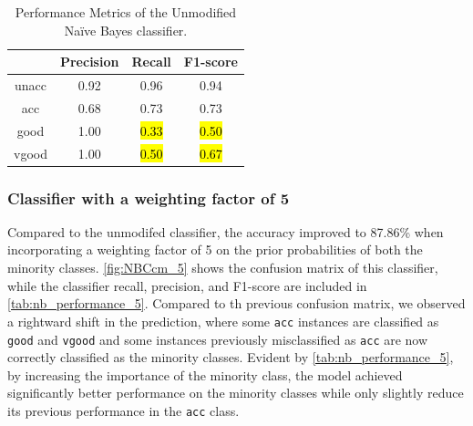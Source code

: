 \documentclass[a4paper]{article}
\begin{document}
\begin{table}[h!]
  \centering
  \caption{Performance Metrics of the Unmodified Naïve Bayes classifier.}
  \label{tab:nb_performance_unmodified}
  \begin{tabular}{||cccc||}
  \hline
  \textbf{ }        & \textbf{Precision}    & \textbf{Recall}   & \textbf{F1-score} \\
  \hline \hline
  unacc             & 0.92                  & 0.96              & 0.94\\ \hline
  acc               & 0.68                  & 0.73              & 0.73\\ \hline
  good              & 1.00                  & \hl{0.33}         & \hl{0.50}\\ \hline
  vgood             & 1.00                  & \hl{0.50}          & \hl{0.67}\\
  \hline
  \end{tabular}
\end{table}

\subsubsection{Classifier with a weighting factor of 5}
Compared to the unmodifed classifier, the accuracy improved to 87.86\% when incorporating a weighting factor of 5 on the prior probabilities of both the minority classes. \autoref{fig:NBCcm_5} shows the confusion matrix of this classifier, while the classifier recall, precision, and F1-score are included in \autoref{tab:nb_performance_5}. Compared to th previous confusion matrix, we observed a rightward shift in the prediction, where some \lstinline{acc} instances are classified as \lstinline{good} and \lstinline{vgood} and some instances previously misclassified as \lstinline{acc} are now correctly classified as the minority classes. Evident by \autoref{tab:nb_performance_5}, by increasing the importance of the minority class, the model achieved significantly better performance on the minority classes while only slightly reduce its previous performance in the \lstinline{acc} class.
\end{document}
